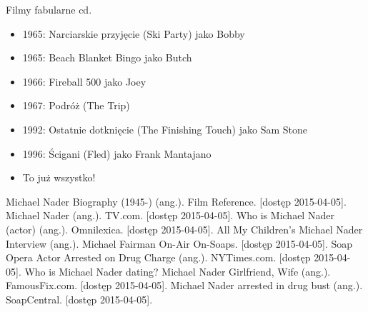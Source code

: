 \documentclass{beamer}
\begin{document}
\begin{frame}{Filmy fabularne cd.}
\begin{itemize}
\item<-1> 1965: Narciarskie przyjęcie (Ski Party) jako Bobby
\item<-1> 1965: Beach Blanket Bingo jako Butch
\item<-1> 1966: Fireball 500 jako Joey
\item<-1> 1967: Podróż (The Trip)
\item<-1> 1992: Ostatnie dotknięcie (The Finishing Touch) jako Sam Stone
\item<-1> 1996: Ścigani (Fled) jako Frank Mantajano
\pause
\item To już wszystko!
\end{itemize}
\end{frame}

\begin{thebibliography}{99}
 Michael Nader Biography (1945-) (ang.). Film Reference. [dostęp 2015-04-05].
 Michael Nader (ang.). TV.com. [dostęp 2015-04-05].
 Who is Michael Nader (actor) (ang.). Omnilexica. [dostęp 2015-04-05].
 All My Children’s Michael Nader Interview (ang.). Michael Fairman On-Air On-Soaps. [dostęp 2015-04-05].
 Soap Opera Actor Arrested on Drug Charge (ang.). NYTimes.com. [dostęp 2015-04-05].
 Who is Michael Nader dating? Michael Nader Girlfriend, Wife (ang.). FamousFix.com. [dostęp 2015-04-05].
 Michael Nader arrested in drug bust (ang.). SoapCentral. [dostęp 2015-04-05].
\end{thebibliography}
\end{document}
